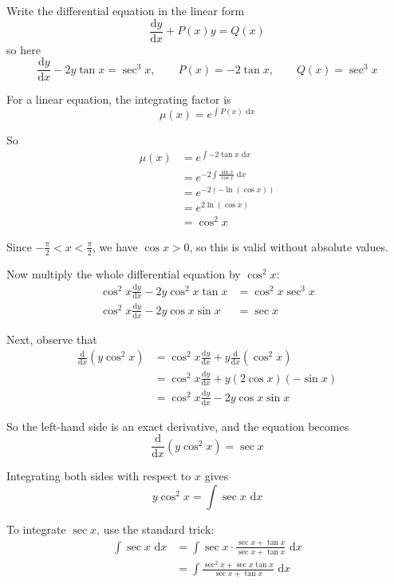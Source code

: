 \documentclass[leqno]{article}
\begin{document}
\begin{enumerate}[
  label=\textbf{\arabic*.},
  leftmargin=*,
  topsep=0pt,
  partopsep=0pt,
  parsep=0pt
]
\vspace*{30pt}

\begin{tcolorbox}[colback=white, colframe=scarlet, title={\textbf{Solution}}, breakable, grow to left by=6mm, grow to right by=10mm]
Write the differential equation in the linear form
\[
\frac{\mathrm{d}y}{\mathrm{d}x}+P(x)y=Q(x)
\]
so here
\[
\frac{\mathrm{d}y}{\mathrm{d}x}-2y\tan x=\sec^3 x,\qquad P(x)=-2\tan x,\qquad Q(x)=\sec^3 x
\]

For a linear equation, the integrating factor is
\[
\mu(x)=e^{\int P(x)\,\,\mathrm{d}x}
\]

So
\begin{align*}
\mu(x)&=e^{\int -2\tan x\,\,\mathrm{d}x} \\
&=e^{-2\int \frac{\sin x}{\cos x}\,\,\mathrm{d}x} \\
&=e^{-2(-\ln(\cos x))} \\
&=e^{2\ln(\cos x)} \\
&=\cos^2 x
\end{align*}

Since $-\frac{\pi}{2}<x<\frac{\pi}{2}$, we have $\cos x>0$, so this is valid without absolute values.

Now multiply the whole differential equation by $\cos^2 x$:
\begin{align*}
\cos^2 x\frac{\mathrm{d}y}{\mathrm{d}x}-2y\cos^2 x\tan x&=\cos^2 x\sec^3 x \\
\cos^2 x\frac{\mathrm{d}y}{\mathrm{d}x}-2y\cos x\sin x&=\sec x
\end{align*}

Next, observe that
\begin{align*}
\frac{\mathrm{d}}{\mathrm{d}x}(y\cos^2 x)
&=\cos^2 x\frac{\mathrm{d}y}{\mathrm{d}x}+y\frac{\mathrm{d}}{\mathrm{d}x}(\cos^2 x) \\
&=\cos^2 x\frac{\mathrm{d}y}{\mathrm{d}x}+y(2\cos x)(-\sin x) \\
&=\cos^2 x\frac{\mathrm{d}y}{\mathrm{d}x}-2y\cos x\sin x
\end{align*}

So the left-hand side is an exact derivative, and the equation becomes
\[
\frac{\mathrm{d}}{\mathrm{d}x}(y\cos^2 x)=\sec x
\]

Integrating both sides with respect to $x$ gives
\[
y\cos^2 x=\int \sec x\,\,\mathrm{d}x
\]

To integrate $\sec x$, use the standard trick:
\begin{align*}
\int \sec x\,\,\mathrm{d}x
&=\int \sec x\cdot \frac{\sec x+\tan x}{\sec x+\tan x}\,\,\mathrm{d}x \\
&=\int \frac{\sec^2 x+\sec x\tan x}{\sec x+\tan x}\,\,\mathrm{d}x
\end{align*}


\end{tcolorbox}
\end{enumerate}
\end{document}
